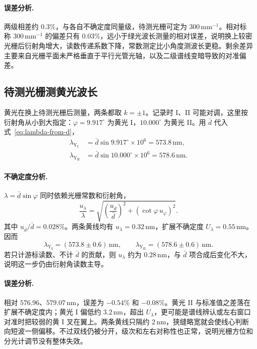 \documentclass{../template/myrpt}
\begin{document}
\paragraph{误差分析.}
两级相差约 $0.3\%$，与各自不确定度同量级，待测光栅可定为 $300\,\mathrm{mm}^{-1}$。相对标称 $300\,\mathrm{mm}^{-1}$ 的偏差只有 $0.03\%$，远小于绿光波长测量的相对误差，说明换上较密光栅后衍射角增大，读数传递系数下降，常数测定比小角度测波长更稳。剩余差异主要来自光栅平面未严格垂直于平行光管光轴，以及二级谱线变暗导致的对准偏差。

\subsection{待测光栅测黄光波长}

黄光在换上待测光栅后测量，两条都取 $k=\pm1$。记录时 I、II 可能对调，这里按衍射角从小到大指定：$\varphi=9.917^\circ$ 为黄光 I，$10.000^\circ$ 为黄光 II。用 $\bar d$ 代入式~\eqref{eq:lambda-from-d}，
\begin{align*}
  \lambda_{\mathrm{Y_I}}
  &=\bar d\sin 9.917^\circ\times10^{6}
  =573.8\,\si{\nano\metre},\\
  \lambda_{\mathrm{Y_{II}}}
  &=\bar d\sin 10.000^\circ\times10^{6}
  =578.6\,\si{\nano\metre}.
\end{align*}

\paragraph{不确定度分析.}
$\lambda=\bar d\sin\varphi$ 同时依赖光栅常数和衍射角，
\[
  \frac{u_\lambda}{\lambda}
  =\sqrt{\left(\frac{u_{\bar d}}{\bar d}\right)^2+(\cot\varphi\,u_\varphi)^2}.
\]
其中 $u_{\bar d}/\bar d=0.028\%$。两条黄线均有 $u_\lambda=0.32\,\si{\nano\metre}$，扩展不确定度 $U_\lambda=0.55\,\si{\nano\metre}$。因而
\[
  \lambda_{\mathrm{Y_I}}=(573.8\pm0.6)\,\si{\nano\metre},\qquad
  \lambda_{\mathrm{Y_{II}}}=(578.6\pm0.6)\,\si{\nano\metre}.
\]
若只计游标读数、不计 $\bar d$ 的贡献，则 $u_\lambda$ 约为 $0.28\,\si{\nano\metre}$，与 $\bar d$ 项合成后变化不大，说明这一步仍由衍射角读数主导。

\paragraph{误差分析.}
相对 $576.96$、$579.07\,\si{\nano\metre}$，误差为 $-0.54\%$ 和 $-0.08\%$。黄光 II 与标准值之差落在扩展不确定度内；黄光 I 偏低约 $3.2\,\si{\nano\metre}$，超出 $U_\lambda$，更可能是谱线辨认或左右窗口对准时把较弱的黄 I 叉在翼上。两条黄线只隔约 $2\,\si{\nano\metre}$，狭缝略宽就会使线心判断向短波一侧偏移。不过双线仍被分开，级次和左右对称性也正常，说明光栅方位和分光计调节没有整体失效。
\end{document}
